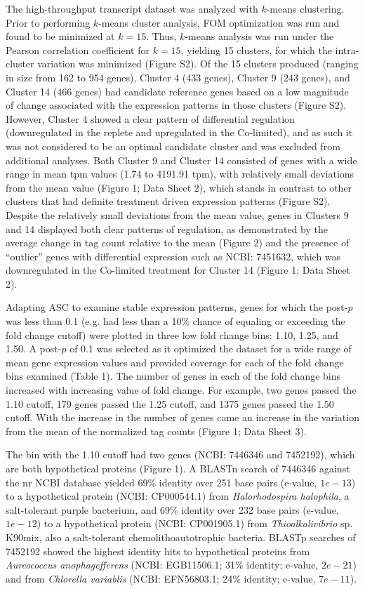 The high-throughput transcript dataset was analyzed with $k$-means clustering. Prior to performing $k$-means cluster analysis, FOM optimization was run and found to be minimized at $k=1$5. Thus, $k$-means analysis was run under the Pearson correlation coefficient for $k=15$, yielding 15 clusters, for which the intra-cluster variation was minimized (Figure S2). Of the 15 clusters produced (ranging in size from 162 to 954 genes), Cluster 4 (433 genes), Cluster 9 (243 genes), and Cluster 14 (466 genes) had candidate reference genes based on a low magnitude of change associated with the expression patterns in those clusters (Figure S2). However, Cluster 4 showed a clear pattern of differential regulation (downregulated in the replete and upregulated in the Co-limited), and as such it was not considered to be an optimal candidate cluster and was excluded from additional analyses. Both Cluster 9 and Cluster 14 consisted of genes with a wide range in mean tpm values (1.74 to 4191.91 tpm), with relatively small deviations from the mean value (Figure 1; Data Sheet 2), which stands in contrast to other clusters that had definite treatment driven expression patterns (Figure S2). Despite the relatively small deviations from the mean value, genes in Clusters 9 and 14 displayed both clear patterns of regulation, as demonstrated by the average change in tag count relative to the mean (Figure 2) and the presence of “outlier” genes with differential expression such as NCBI: 7451632, which was downregulated in the Co-limited treatment for Cluster 14 (Figure 1; Data Sheet 2). \par
Adapting ASC to examine stable expression patterns, genes for which the post-$p$ was less than 0.1 (e.g. had less than a 10\% chance of equaling or exceeding the fold change cutoff) were plotted in three low fold change bins: 1.10, 1.25, and 1.50. A post-$p$ of 0.1 was selected as it optimized the dataset for a wide range of mean gene expression values and provided coverage for each of the fold change bins examined (Table 1). The number of genes in each of the fold change bins increased with increasing value of fold change. For example, two genes passed the 1.10 cutoff, 179 genes passed the 1.25 cutoff, and 1375 genes passed the 1.50 cutoff. With the increase in the number of genes came an increase in the variation from the mean of the normalized tag counts (Figure 1; Data Sheet 3). \par
The bin with the 1.10 cutoff had two genes (NCBI: 7446346 and 7452192), which are both hypothetical proteins (Figure 1). A BLASTn search of 7446346 against the nr NCBI database yielded 69\% identity over 251 base pairs (e-value, $1e-13$) to a hypothetical protein (NCBI: CP000544.1) from \textit{Halorhodospira halophila}, a salt-tolerant purple bacterium, and 69\% identity over 232 base pairs (e-value, $1e-12$) to a hypothetical protein (NCBI: CP001905.1) from \textit{Thioalkalivibrio} sp. K90mix, also a salt-tolerant chemolithoautotrophic bacteria. BLASTp searches of 7452192 showed the highest identity hits to hypothetical proteins from \textit{Aureococcus anophagefferens} (NCBI: EGB11506.1; 31\% identity; e-value, $2e-21$) and from \textit{Chlorella variablis} (NCBI: EFN56803.1; 24\% identity; e-value, $7e-11$).\par 
